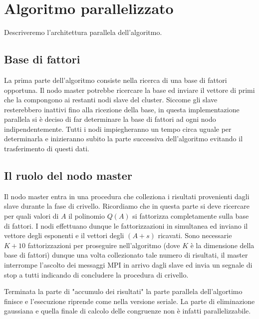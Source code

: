 \section{Algoritmo parallelizzato}
\label{sec:parallelo}
Descriveremo l'architettura parallela dell'algoritmo.
\subsection{Base di fattori}
La prima parte dell'algoritmo consiste nella ricerca di una base di
fattori opportuna. Il nodo master potrebbe ricercare la base ed inviare il
vettore di primi che la compongono ai restanti nodi slave del
cluster. Siccome gli slave resterebbero inattivi fino alla ricezione
della base, in questa implementazione parallela si è deciso di far
determinare la base di fattori ad ogni nodo indipendentemente. Tutti i
nodi impiegheranno un tempo circa uguale per determinarla e inizieranno
subito la parte successiva dell'algoritmo evitando il trasferimento di
questi dati.
\subsection{Il ruolo del nodo master}
Il nodo master entra in una procedura che colleziona i risultati
provenienti dagli slave durante la fase di crivello. Ricordiamo che in
questa parte si deve ricercare per quali valori di $A$ il polinomio $Q(A)$
si fattorizza completamente sulla base di fattori. I nodi effettuano
dunque le fattorizzazioni in simultanea ed
inviano il vettore degli esponenti e il vettori degli $(A + s)$
ricavati. Sono necessarie $K+10$ fattorizzazioni per proseguire
nell'algoritmo (dove $K$ è la dimensione della base di fattori) dunque
una volta collezionato tale numero di risultati, il master interrompe
l'ascolto dei messaggi MPI in arrivo dagli slave ed invia un segnale
di stop a tutti indicando di concludere la procedura di crivello.

Terminata la parte di "accumulo dei risultati" la parte parallela
dell'algortimo finisce e l'esecuzione riprende come nella versione
seriale. La parte di eliminazione gaussiana e quella finale di calcolo
delle congruenze non è infatti parallelizzabile.

